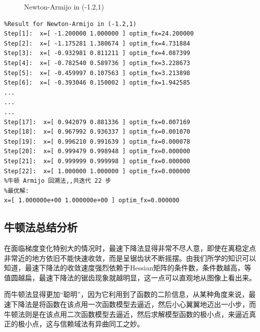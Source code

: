 \begin{figure}[H]
\caption{Newton-Armijo in (-1.2,1)}
\label{Fig.lable}
\end{figure}

\begin{lstlisting}
%Result for Newton-Armijo in (-1.2,1)
Step[1]:  x=[ -1.200000 1.000000 ] optim_fx=24.200000
Step[2]:  x=[ -1.175281 1.380674 ] optim_fx=4.731884
Step[3]:  x=[ -0.932981 0.811211 ] optim_fx=4.087399
Step[4]:  x=[ -0.782540 0.589736 ] optim_fx=3.228673
Step[5]:  x=[ -0.459997 0.107563 ] optim_fx=3.213898
Step[6]:  x=[ -0.393046 0.150002 ] optim_fx=1.942585
...
...
...
Step[17]:  x=[ 0.942079 0.881336 ] optim_fx=0.007169
Step[18]:  x=[ 0.967992 0.936337 ] optim_fx=0.001070
Step[19]:  x=[ 0.996210 0.991639 ] optim_fx=0.000078
Step[20]:  x=[ 0.999479 0.998948 ] optim_fx=0.000000
Step[21]:  x=[ 0.999999 0.999998 ] optim_fx=0.000000
Step[22]:  x=[ 1.000000 1.000000 ] optim_fx=0.000000
%牛顿 Armijo 回溯法,,共迭代 22 步
%最优解:
x=[ 1.000000e+00 1.000000e+00 ] optim_fx=0.000000
\end{lstlisting}

\newpage
\subsection{牛顿法总结分析}
在面临梯度变化特别大的情况时，最速下降法显得非常不尽人意，即使在离稳定点非常近的地方依旧不能快速收敛，而是呈锯齿状不断摇摆。由我们所学的知识可以知道，最速下降法的收敛速度强烈依赖于Hessian矩阵的条件数，条件数越高，等值圆越扁，最速下降法的锯齿现象就越明显，这一点可以直观地从图像上看出来。

而牛顿法显得更加“聪明”，因为它利用到了函数的二阶信息，从某种角度来说，最速下降法是将函数在该点用一次函数模型去逼近，然后小心翼翼地迈出一小步，而牛顿法则是在该点用二次函数模型去逼近，然后求解模型函数的极小点，来逼近真正的极小点，这与信赖域法有异曲同工之妙。

